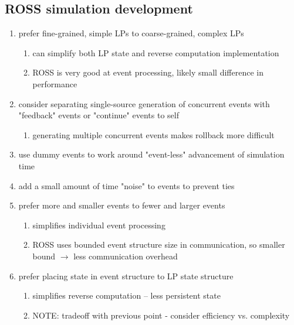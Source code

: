 \documentclass[conference,10pt,compsocconf,onecolumn]{IEEEtran}
\begin{document}
\subsection{ROSS simulation development}

\begin{enumerate}

    \item prefer fine-grained, simple LPs to coarse-grained, complex LPs
    \begin{enumerate}
        \item can simplify both LP state and reverse computation implementation
        \item ROSS is very good at event processing, likely small difference in
            performance
    \end{enumerate}

    \item consider separating single-source generation of concurrent events with
        "feedback" events or "continue" events to self
    \begin{enumerate}
        \item generating multiple concurrent events makes rollback more difficult
    \end{enumerate}

    \item use dummy events to work around "event-less" advancement of simulation time 

    \item add a small amount of time "noise" to events to prevent ties

    \item prefer more and smaller events to fewer and larger events
    \begin{enumerate}
        \item simplifies individual event processing
        \item ROSS uses bounded event structure size in communication, so
            smaller bound $\rightarrow$  less communication overhead
    \end{enumerate}

    \item prefer placing state in event structure to LP state structure
    \begin{enumerate}
        \item simplifies reverse computation -- less persistent state
        \item NOTE: tradeoff with previous point - consider efficiency vs.
            complexity
    \end{enumerate}


\end{enumerate}
\end{document}
